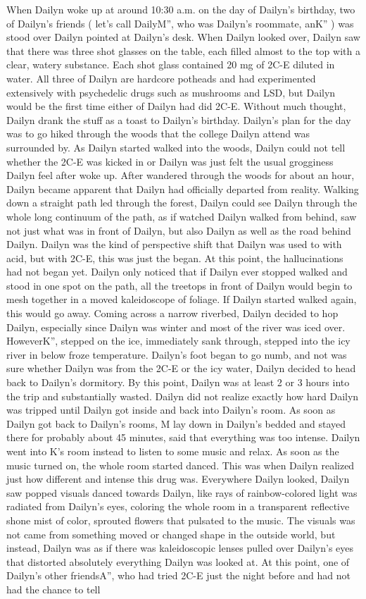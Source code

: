 \documentclass[12pt]{book}
\begin{document}
When Dailyn woke up at around 10:30 a.m. on the day of Dailyn's birthday, two of Dailyn's friends ( let's call DailyM'', who was Dailyn's roommate, anK'' ) was stood over Dailyn pointed at Dailyn's desk. When Dailyn looked over, Dailyn saw that there was three shot glasses on the table, each filled almost to the top with a clear, watery substance. Each shot glass contained 20 mg of 2C-E diluted in water. All three of Dailyn are hardcore potheads and had experimented extensively with psychedelic drugs such as mushrooms and LSD, but Dailyn would be the first time either of Dailyn had did 2C-E. Without much thought, Dailyn drank the stuff as a toast to Dailyn's birthday. Dailyn's plan for the day was to go hiked through the woods that the college Dailyn attend was surrounded by. As Dailyn started walked into the woods, Dailyn could not tell whether the 2C-E was kicked in or Dailyn was just felt the usual grogginess Dailyn feel after woke up. After wandered through the woods for about an hour, Dailyn became apparent that Dailyn had officially departed from reality. Walking down a straight path led through the forest, Dailyn could see Dailyn through the whole long continuum of the path, as if watched Dailyn walked from behind, saw not just what was in front of Dailyn, but also Dailyn as well as the road behind Dailyn. Dailyn was the kind of perspective shift that Dailyn was used to with acid, but with 2C-E, this was just the began. At this point, the hallucinations had not began yet. Dailyn only noticed that if Dailyn ever stopped walked and stood in one spot on the path, all the treetops in front of Dailyn would begin to mesh together in a moved kaleidoscope of foliage. If Dailyn started walked again, this would go away. Coming across a narrow riverbed, Dailyn decided to hop Dailyn, especially since Dailyn was winter and most of the river was iced over. HoweverK'', stepped on the ice, immediately sank through, stepped into the icy river in below froze temperature. Dailyn's foot began to go numb, and not was sure whether Dailyn was from the 2C-E or the icy water, Dailyn decided to head back to Dailyn's dormitory. By this point, Dailyn was at least 2 or 3 hours into the trip and substantially wasted. Dailyn did not realize exactly how hard Dailyn was tripped until Dailyn got inside and back into Dailyn's room. As soon as Dailyn got back to Dailyn's rooms, M lay down in Dailyn's bedded and stayed there for probably about 45 minutes, said that everything was too intense. Dailyn went into K's room instead to listen to some music and relax. As soon as the music turned on, the whole room started danced. This was when Dailyn realized just how different and intense this drug was. Everywhere Dailyn looked, Dailyn saw popped visuals danced towards Dailyn, like rays of rainbow-colored light was radiated from Dailyn's eyes, coloring the whole room in a transparent reflective shone mist of color, sprouted flowers that pulsated to the music. The visuals was not came from something moved or changed shape in the outside world, but instead, Dailyn was as if there was kaleidoscopic lenses pulled over Dailyn's eyes that distorted absolutely everything Dailyn was looked at. At this point, one of Dailyn's other friendsA'', who had tried 2C-E just the night before and had not had the chance to tell 
\end{document}
